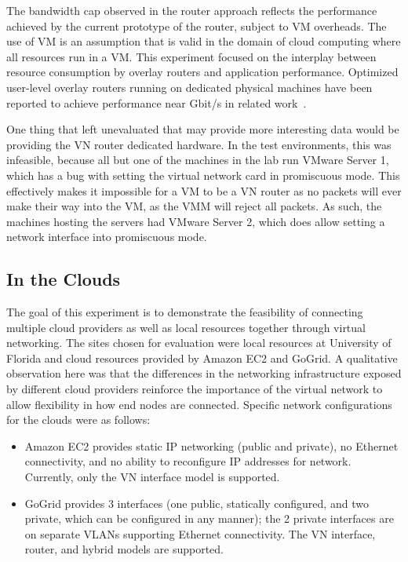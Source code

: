 The bandwidth cap observed in the router approach reflects the performance
achieved by the current prototype of the router, subject to VM overheads. The
use of VM is an assumption that is valid in the domain of cloud computing where
all resources run in a VM. This experiment focused on the interplay between
resource consumption by overlay routers and application performance.  Optimized
user-level overlay routers running on dedicated physical machines have been
reported to achieve performance near Gbit/s in related work~\cite{vine2}.

One thing that left unevaluated that may provide more interesting data would be
providing the VN router dedicated hardware.  In the test environments, this was
infeasible, because all but one of the machines in the lab run VMware Server 1,
which has a bug with setting the virtual network card in promiscuous mode.
This effectively makes it impossible for a VM to be a VN router as no packets
will ever make their way into the VM, as the VMM will reject all packets.  As
such, the machines hosting the servers had VMware Server 2, which does allow
setting a network interface into promiscuous mode.

\subsection{In the Clouds}

The goal of this experiment is to demonstrate the feasibility of connecting
multiple cloud providers as well as local resources together through virtual
networking.  The sites chosen for evaluation were local resources at University
of Florida and cloud resources provided by Amazon EC2 and GoGrid.  A
qualitative observation here was that the differences in the networking
infrastructure exposed by different cloud providers reinforce the importance of
the virtual network to allow flexibility in how end nodes are connected.
Specific network configurations for the clouds were as follows:

\begin{itemize}

\item Amazon EC2 provides static IP networking (public and private), no
Ethernet connectivity, and no ability to reconfigure IP addresses for network.
Currently, only the VN interface model is supported.

\item GoGrid provides 3 interfaces (one public, statically configured, and two
private, which can be configured in any manner); the 2 private interfaces are
on separate VLANs supporting Ethernet connectivity. The VN interface, router,
and hybrid models are supported.

\end{itemize}

